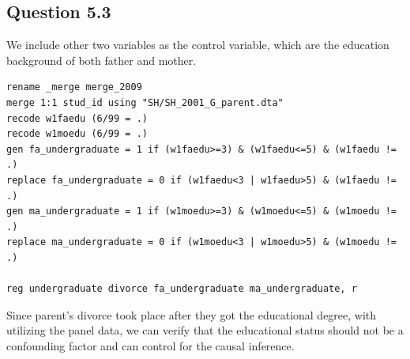 \documentclass[11pt, letterpaper]{article}
\begin{document}
\subsection*{Question 5.3}

We include other two variables as the control variable, which are the education background of both father and mother.

\begin{lstlisting}
rename _merge merge_2009
merge 1:1 stud_id using "SH/SH_2001_G_parent.dta"
recode w1faedu (6/99 = .)
recode w1moedu (6/99 = .)
gen fa_undergraduate = 1 if (w1faedu>=3) & (w1faedu<=5) & (w1faedu != .)
replace fa_undergraduate = 0 if (w1faedu<3 | w1faedu>5) & (w1faedu != .)
gen ma_undergraduate = 1 if (w1moedu>=3) & (w1moedu<=5) & (w1moedu != .)
replace ma_undergraduate = 0 if (w1moedu<3 | w1moedu>5) & (w1moedu != .)

reg undergraduate divorce fa_undergraduate ma_undergraduate, r
\end{lstlisting}

Since parent's divorce took place after they got the educational degree, with utilizing the panel data, we can verify that the educational status should not be a confounding factor and can control for the causal inference.
\end{document}
